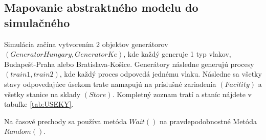 \documentclass[11pt,a4paper]{article}
\begin{document}
\subsection{Mapovanie abstraktného modelu do simulačného}
\label{sec:MAPOVANIE}

Simulácia začína vytvorením 2 objektov generátorov $(GeneratorHungary, GeneratorKe)$, kde každý generuje 1 typ vlakov, Budapešť-Praha alebo Bratislava-Košice.
Generátory následne generujú procesy $(train1, train2)$, kde každý proces odpovedá jednému vlaku.
Následne sa všetky stavy odpovedajúce úsekom trate namapujú na príslušné zariadenia $(Facility)$ a všetky stanice na sklady $(Store)$.
Kompletný zoznam tratí a staníc nájdete v tabuľke \ref{tab:USEKY}.

Na časové prechody sa používa metóda $Wait()$ na pravdepodobnostné Metóda $Random()$.
\end{document}
